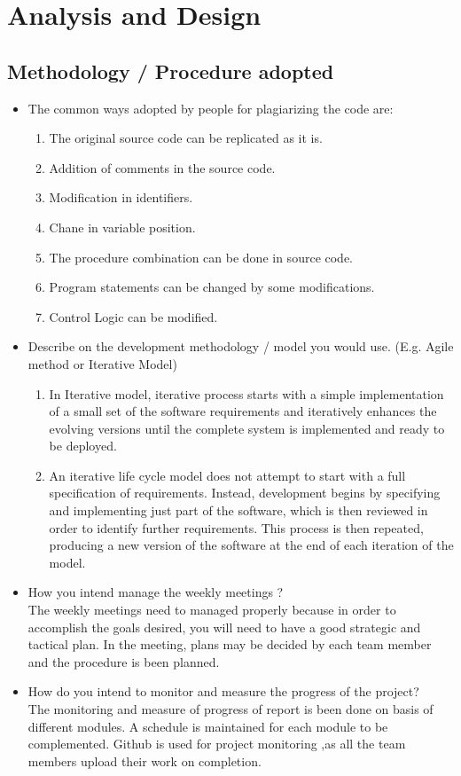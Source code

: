 		\chapter{Analysis and Design}
		\section{Methodology / Procedure adopted}
		\begin{itemize}
		\item The common ways adopted by people for plagiarizing the code are:
		\begin{enumerate}
		 \item The original source code can be replicated as it is.
		 \item Addition of comments in the source code.
		 \item Modification in identifiers. 
		 \item Chane in variable position.
		 \item The procedure combination can be done in source code.
		 \item Program statements can be changed by some modifications.
		 \item Control Logic can be modified.
		 \end{enumerate}
		\item Describe on the development methodology / model you would use. (E.g. Agile method or Iterative Model)
		\begin{enumerate}
		\item In Iterative model, iterative process starts with a simple implementation of a small set of the software requirements and iteratively enhances the evolving versions until the complete system is implemented and ready to be deployed.
		\item An iterative life cycle model does not attempt to start with a full specification of requirements. Instead, development begins by specifying and implementing just part of the software, which is then reviewed in order to identify further requirements. This process is then repeated, producing a new version of the software at the end of each iteration of the model.\\
		\end{enumerate}
		\item How you intend manage the weekly meetings ? \\
		The weekly meetings need to managed properly because in order to accomplish the goals desired, you will need to have a good strategic and tactical plan. In the meeting, plans may be decided by each team member and the procedure is been planned.
		\item How do you intend to monitor and measure the progress of the project? \\ 
		The monitoring and measure of progress of report is been done on basis of different modules. A schedule is maintained for each module to be complemented. Github is used for project monitoring ,as all the team members upload their work on completion. 
		\end{itemize}
